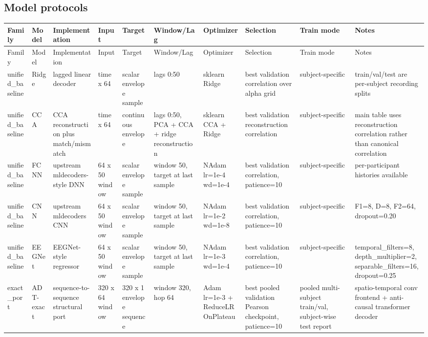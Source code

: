 \documentclass[11pt]{article}
\begin{document}
\subsection*{Model protocols}
\begin{longtable}{p{1.4cm} p{1.6cm} p{2.2cm} p{1.8cm} p{1.8cm} p{2.0cm} p{2.4cm} p{2.6cm} p{2.0cm} p{2.8cm}}
\toprule
Family & Model & Implementation & Input & Target & Window/Lag & Optimizer & Selection & Train mode & Notes \\
\midrule
\endfirsthead
\toprule
Family & Model & Implementation & Input & Target & Window/Lag & Optimizer & Selection & Train mode & Notes \\
\midrule
\endhead
unified\_baseline & Ridge & lagged linear decoder & time x 64 & scalar envelope sample & lags 0:50 & sklearn Ridge & best validation correlation over alpha grid & subject-specific & train/val/test are per-subject recording splits \\
unified\_baseline & CCA & CCA reconstruction plus match/mismatch & time x 64 & continuous envelope & lags 0:50, PCA + CCA + ridge reconstruction & sklearn CCA + Ridge & best validation reconstruction correlation & subject-specific & main table uses reconstruction correlation rather than canonical correlation \\
unified\_baseline & FCNN & upstream mldecoders-style DNN & 64 x 50 window & scalar envelope sample & window 50, target at last sample & NAdam lr=1e-4 wd=1e-4 & best validation correlation, patience=10 & subject-specific & per-participant histories available \\
unified\_baseline & CNN & upstream mldecoders CNN & 64 x 50 window & scalar envelope sample & window 50, target at last sample & NAdam lr=1e-2 wd=1e-8 & best validation correlation, patience=10 & subject-specific & F1=8, D=8, F2=64, dropout=0.20 \\
unified\_baseline & EEGNet & EEGNet-style regressor & 64 x 50 window & scalar envelope sample & window 50, target at last sample & NAdam lr=1e-3 wd=1e-4 & best validation correlation, patience=10 & subject-specific & temporal\_filters=8, depth\_multiplier=2, separable\_filters=16, dropout=0.25 \\
exact\_port & ADT-exact & sequence-to-sequence structural port & 320 x 64 window & 320 x 1 envelope sequence & window 320, hop 64 & Adam lr=1e-3 + ReduceLROnPlateau & best pooled validation Pearson checkpoint, patience=10 & pooled multi-subject train/val, subject-wise test report & spatio-temporal conv frontend + anti-causal transformer decoder \\

\end{longtable}
\end{document}
